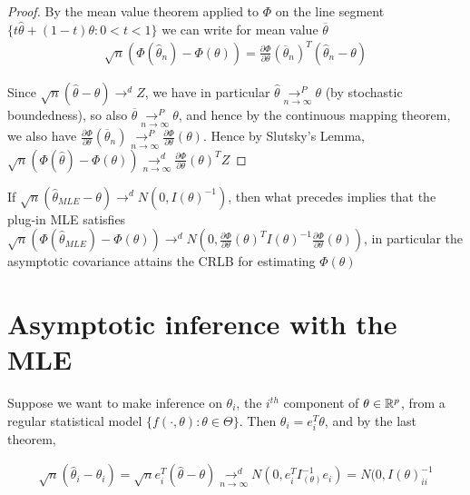 \documentclass[a4paper]{article}
\begin{document}
\begin{proof}
	By the mean value theorem applied to $\Phi$ on the line segment $\{t \hat{\theta} + (1-t)\theta : 0<t<1\} $ we can write for mean value $\overline{\theta}$
	\begin{align*}
		\sqrt{n}(\Phi(\hat{\theta}_n) - \Phi(\theta)) = \frac{\partial\Phi}{\partial\theta}(\overline{\theta}_n)^{T}(\hat{\theta}_n - \theta)
	\end{align*}

	Since $\sqrt{n}(\hat{\theta} - \theta) \to ^{d} Z $, we have in particular $\hat{\theta} \underset{n\to \infty}{\to ^{P}} \theta$ (by stochastic boundedness), so also $\overline{\theta} \underset{n\to \infty}{\to ^{P}} \theta$, and hence by the continuous mapping theorem, we also have $\frac{\partial\Phi}{\partial\theta}(\overline{\theta}_n) \underset{n\to \infty}{\to ^{P}} \frac{\partial\Phi}{\partial\theta} (\theta)$. Hence by Slutsky's Lemma, $\sqrt{n}(\Phi(\hat{\theta}) - \Phi(\theta)) \underset{n\to \infty}{\to ^{d}} \frac{\partial\Phi}{\partial\theta}(\theta)^{T} Z$ 
	
\end{proof}

\begin{remark}
	If $\sqrt{n}( \hat{\theta}_{MLE} - \theta) \to ^{d} N(0, I(\theta)^{-1})$, then what precedes implies that the plug-in MLE satisfies $\sqrt{n} (\Phi(\hat{\theta}_{MLE}) - \Phi(\theta)) \to ^{d} N\left(0, \frac{\partial\Phi}{\partial\theta}(\theta)^{T} I(\theta)^{-1} \frac{\partial\Phi}{\partial\theta}(\theta)\right)$, in particular the asymptotic covariance attains the CRLB for estimating $\Phi(\theta)$
	
\end{remark}

\section{Asymptotic inference with the MLE}

Suppose we want to make inference on $\theta_i$, the $i^{th}$ component of $\theta \in \mathbb{R}^{p}$, from a regular statistical model $\{f\left( \cdot , \theta \right) : \theta \in \Theta \}$. Then $\theta_i = e_i ^{T} \theta$, and by the last theorem,

\begin{align*}
	\sqrt{n} (\hat{\theta}_i - \theta_i) = \sqrt{n} e_i ^{T} (\hat{\theta} - \theta) \underset{n\to \infty}{\to ^{d}} N(0, e_i ^{T} I_(\theta)^{-1} e_i) = N(0, I(\theta)^{-1}_{ii}  
\end{align*}
\end{document}
